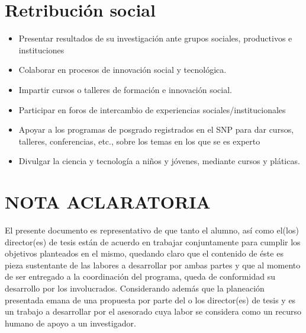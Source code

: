 \documentclass[runningheads,a4paper]{llncs}
\begin{document}
\section{Retribución social}
\begin{itemize}
    \item Presentar resultados de su investigación ante grupos sociales, productivos e instituciones 
    \item Colaborar en procesos de innovación social y tecnológica.
    \item Impartir cursos o talleres de formación e innovación social.
    \item Participar en foros de intercambio de experiencias sociales/institucionales
    \item Apoyar a los programas de posgrado registrados en el SNP para dar cursos, talleres, conferencias, etc., sobre los temas en los que se es experto
    \item Divulgar la ciencia y tecnología a niños y jóvenes, mediante cursos y pláticas.

 \end{itemize}



\section{NOTA ACLARATORIA}
El presente documento es representativo de que tanto el alumno, así como el(los) director(es) de tesis están de acuerdo en trabajar conjuntamente para cumplir los objetivos planteados en el mismo, quedando claro que el contenido de éste es pieza sustentante de las labores a desarrollar por ambas partes y que al momento de ser entregado a la coordinación del programa, queda de conformidad su desarrollo por los involucrados. Considerando además que la planeación presentada emana de una propuesta por parte del o los director(es) de tesis y es un trabajo a desarrollar por el asesorado cuya labor se considera como un recurso humano de apoyo a un investigador.

\end{document}
